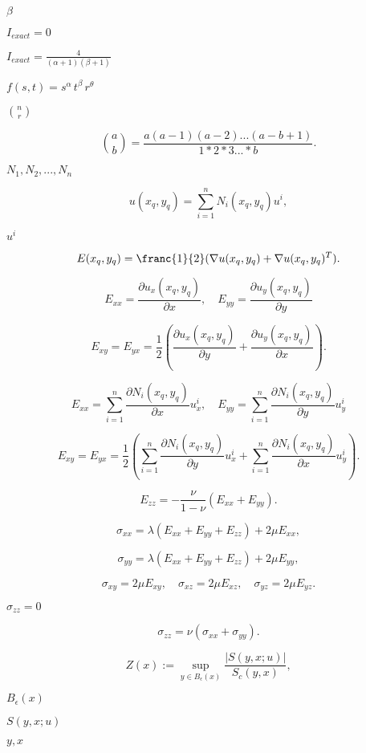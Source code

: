 \documentclass{article}
\begin{document}
$ \beta$
\pagebreak

$ I_{exact}
= 0$
\pagebreak

$ I_{exact} = \frac{4}{(\alpha +1) (\beta+1)} $
\pagebreak

$ f(s,t) = s^\alpha\, t^\beta \, r^\theta
$
\pagebreak

$ {n\choose r}$
\pagebreak

\[ {a \choose b} = \frac{a (a-1) (a-2) ... (a-b+1)}{1*2*3
... *b}. \]
\pagebreak

$ N_1, N_2,..., N_n
$
\pagebreak

\[ u(x_q,y_q) = \sum_{i=1}^n N_i(x_q, y_q) u^i, \]
\pagebreak

$ u^i $
\pagebreak

\[ E(x_q, y_q) = \franc{1}{2}( \nabla u(x_q, y_q) + \nabla u(x_q,y_q)^T ).
\]
\pagebreak

\[ E_{xx} = \frac{\partial u_x(x_q, y_q)}{\partial x}, \quad E_{yy} =
\frac{\partial u_y(x_q, y_q)}{\partial y} \]
\pagebreak

\[ E_{xy} = E_{yx} = \frac{1}{2}( \frac{\partial u_x(x_q, y_q)
}{\partial y} + \frac{\partial u_y(x_q, y_q)}{\partial x}). \]
\pagebreak

\[ E_{xx} = \sum_{i=1}^n\frac{\partial N_i(x_q, y_q)}{\partial x} u^i_x,
\quad E_{yy} =  \sum_{i=1}^n \frac{\partial N_i(x_q, y_q)}{\partial y}
u^i_y \]
\pagebreak

\[ E_{xy} = E_{yx} = \frac{1}{2}( \sum_{i=1}^n \frac{\partial N_i(x_q, y_q)
}{\partial y} u^i_x + \sum_{i=1}^n \frac{\partial N_i(x_q, y_q)
}{\partial x} u^i_y). \]
\pagebreak

\[
E_{zz} = -\frac{\nu}{1 - \nu} (E_{xx} + E_{yy}).\]
\pagebreak

\[ \sigma_{xx} = \lambda (E_{xx} + E_{yy} + E_{zz}) + 2\mu E_{xx},\]
\pagebreak

\[\sigma_{yy} = \lambda (E_{xx} + E_{yy} + E_{zz}) + 2\mu E_{yy},\]
\pagebreak

\[ \sigma_{xy} = 2\mu E_{xy},\quad \sigma_{xz} = 2\mu E_{xz}, \quad
\sigma_{yz} = 2\mu E_{yz}.\]
\pagebreak

$ \sigma_{zz} = 0 $
\pagebreak

\[ \sigma_{zz} = \nu (\sigma_{xx} + \sigma_{yy}) .\]
\pagebreak

\[ Z(x) := \sup_{y\in B_\epsilon(x)} \frac{|S(y,x;u)|}{S_c(y,x)}, \]
\pagebreak

$  B_\epsilon(x) $
\pagebreak

$ S(y,
x;u) $
\pagebreak

$y,x$
\pagebreak
\end{document}
